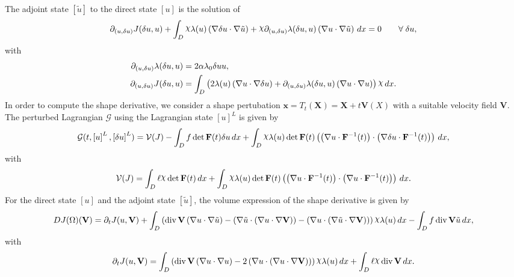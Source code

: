 \documentclass[preview]{standalone}
\let\oldcdot\cdot
\let\cdot\oldcdot
\begin{document}
The adjoint state $\left[ \tilde u\right]$ to the direct state $\left[ u\right]$ is the solution of
\begin{dmath*}
\partial_{(u,\delta u)} J(\delta u,u) +  \int_{D} \raisebox{\depth}{$\chi$} \lambda(u) \left(  \nabla \delta u  \cdot  \nabla \tilde u  \right) + \raisebox{\depth}{$\chi$} \partial_{(u,\delta u)} \lambda(\delta u,u) \left(  \nabla u  \cdot  \nabla \tilde u  \right) \,dx = 0\qquad \forall\; \delta u , 
\end{dmath*}
with 
\begin{align*}
\partial_{(u,\delta u)} \lambda(\delta u,u) &= 2 \alpha \lambda_{0} \delta u u,\\
\partial_{(u,\delta u)} J(\delta u,u) &=  \int_{D} \left(2 \lambda(u) \left(  \nabla u  \cdot  \nabla \delta u  \right) + \partial_{(u,\delta u)} \lambda(\delta u,u) \left(  \nabla u  \cdot  \nabla u  \right)\right) \raisebox{\depth}{$\chi$} \,dx.
 \end{align*}
In order to compute the shape derivative, we consider a shape pertubation $\mathbf x = T_t(\mathbf X) = \mathbf X + t \mathbf  V(X)$ with a suitable velocity field $\mathbf V$. The perturbed Lagrangian $\mathcal G$ using the Lagrangian state $\left[ u\right]^{L}$ is given by
\begin{dmath*}
\mathcal G(t,\left[ u\right]^{L},\left[ \delta u\right]^{L}) = \mathcal V(J) -  \int_{D} f  \operatorname{det}\mathbf F( t )  \delta u \,dx +  \int_{D} \raisebox{\depth}{$\chi$} \lambda(u)  \operatorname{det}\mathbf F( t )  \left( \left(  \nabla u  \cdot  \mathbf F^{-1}(t) \right) \cdot \left(  \nabla \delta u  \cdot  \mathbf F^{-1}(t) \right) \right) \,dx , 
\end{dmath*}
with
\begin{dmath*}
\mathcal V(J) =  \int_{D} \ell \raisebox{\depth}{$\chi$}  \operatorname{det}\mathbf F( t )  \,dx +  \int_{D} \raisebox{\depth}{$\chi$} \lambda(u)  \operatorname{det}\mathbf F( t )  \left( \left(  \nabla u  \cdot  \mathbf F^{-1}(t) \right) \cdot \left(  \nabla u  \cdot  \mathbf F^{-1}(t) \right) \right) \,dx.
 \end{dmath*}
For the direct state $\left[ u\right]$ and the adjoint state $\left[ \tilde u\right]$, the volume expression of the shape derivative is given by
\begin{dmath*}
DJ(\Omega)(\mathbf V) = \partial_{t} J(u,{\mathbf V}) +  \int_{D} \left(\operatorname{div} {\mathbf V} \left(  \nabla u  \cdot  \nabla \tilde u  \right) - \left(  \nabla \tilde u  \cdot \left(  \nabla u  \cdot  \nabla {\mathbf V}  \right) \right) - \left(  \nabla u  \cdot \left(  \nabla \tilde u  \cdot  \nabla {\mathbf V}  \right) \right)\right) \raisebox{\depth}{$\chi$} \lambda(u) \,dx -  \int_{D} f \operatorname{div} {\mathbf V} \tilde u \,dx , 
\end{dmath*}
with
\begin{dmath*}
\partial_{t} J(u,{\mathbf V}) =  \int_{D} \left(\operatorname{div} {\mathbf V} \left(  \nabla u  \cdot  \nabla u  \right) - 2 \left(  \nabla u  \cdot \left(  \nabla u  \cdot  \nabla {\mathbf V}  \right) \right)\right) \raisebox{\depth}{$\chi$} \lambda(u) \,dx +  \int_{D} \ell \raisebox{\depth}{$\chi$} \operatorname{div} {\mathbf V} \,dx.
 \end{dmath*}
\end{document}
